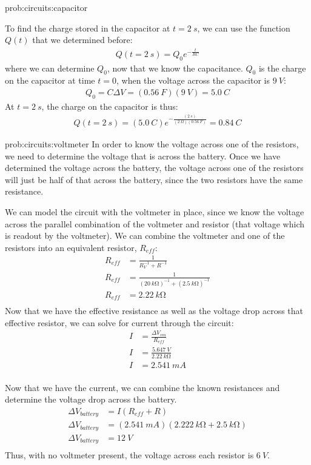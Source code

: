 \begin{solutionParts}{prob:circuits:capacitor}
{\item To find the charge stored in the capacitor at $t = \SI{2}{s}$, we can use the function $Q(t)$ that we determined before:
\begin{align*}
Q(t=\SI{2}{s})=Q_0 e^{-\frac{t}{RC}}
\end{align*}
where we can determine $Q_0$, now that we know the capacitance. $Q_0$ is the charge on the capacitor at time $t=0$, when the voltage across the capacitor is $\SI{9}{V}$:
\begin{align*}
Q_0=C\Delta V = (\SI{0.56}{F})(\SI{9}{V})=\SI{5.0}{C}
\end{align*}
At $t = \SI{2}{s}$, the charge on the capacitor is thus:
\begin{align*}
Q(t = \SI{2}{s})=(\SI{5.0}{C})e^{-\frac{(\SI{2}{s})}{(\SI{2}{\Omega})(\SI{0.56}{F})}}=\SI{0.84}{C}
\end{align*}
}
\end{solutionParts}

\begin{solution}{prob:circuits:voltmeter}\label{soln:circuits:voltmeter} In order to know the voltage across one of the resistors, we need to determine the voltage that is across the battery. Once we have determined the voltage across the battery, the voltage across one of the resistors will just be half of that across the battery, since the two resistors have the same resistance.

We can model the circuit with the voltmeter in place, since we know the voltage across the parallel combination of the voltmeter and resistor (that voltage which is readout by the voltmeter). We can combine the voltmeter and one of the resistors into an equivalent resistor, $R_{eff}$:
\begin{align*}
R_{eff} &= \frac{1}{R_V^{-1}+R^{-1}}\\
R_{eff} &= \frac{1}{(\SI{20}{k\ohm})^{-1}+(\SI{2.5}{k\ohm})^{-1}}\\
R_{eff} &= \SI{2.22}{k\ohm}\\
\end{align*}
Now that we have the effective resistance as well as the voltage drop across that effective resistor, we can solve for current through the circuit:
\begin{align*}
I &= \frac{\Delta V_{vm}}{R_{eff}}\\
I &= \frac{\SI{5.647}{V}}{\SI{2.22}{k\ohm}}\\
I &= \SI{2.541}{mA}\\
\end{align*}

Now that we have the current, we can combine the known resistances and determine the voltage drop across the battery. 
\begin{align*}
\Delta V_{battery} &= I(R_{eff}+R)\\
\Delta V_{battery} &= (\SI{2.541}{mA})(\SI{2.222}{k\ohm}+\SI{2.5}{k\ohm})\\
\Delta V_{battery} &= \SI{12}{V}\\
\end{align*}
Thus, with no voltmeter present, the voltage across each resistor is $\SI{6}{V}$.
\end{solution}

